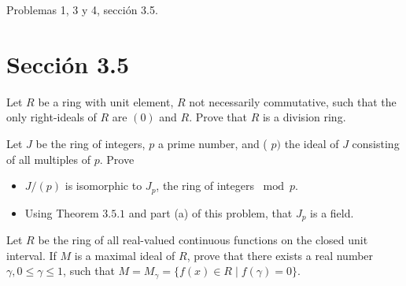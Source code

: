 





Problemas 1, 3 y 4, sección 3.5.
\section*{Sección 3.5}
\begin{problema}[Problema 1]
    Let $R$ be a ring with unit element, $R$ not necessarily commutative, such that the only right-ideals of $R$ are $(0)$ and $R$. Prove that $R$ is a division ring.

\end{problema}

\begin{problema}[Problema 3]

    Let $J$ be the ring of integers, $p$ a prime number, and ( $p)$ the ideal of $J$ consisting of all multiples of $p$. Prove
    \begin{itemize}
        \item $J /(p)$ is isomorphic to $J_{p}$, the ring of integers $\bmod p$.
        \item Using Theorem $3.5 .1$ and part (a) of this problem, that $J_{p}$ is a field.
    \end{itemize}

\end{problema}
\begin{problema}[Problema 4]
    Let $R$ be the ring of all real-valued continuous functions on the closed unit interval. If $M$ is a maximal ideal of $R$, prove that there exists a real number $\gamma, 0 \leq \gamma \leq 1$, such that $M=M_{\gamma}=\{f(x) \in R \mid f(\gamma)=0\}$.
\end{problema}


%
%

